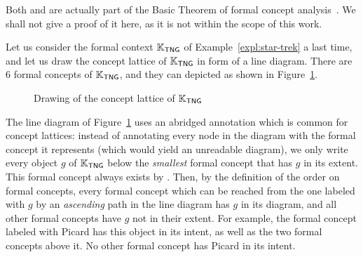 Both  and
 are actually part of the Basic Theorem
of formal concept analysis~\cite[Theorem ??]{fca-book}.  We shall not
give a proof of it here, as it is not within the scope of this work.

\begin{Example}
  \label{expl:star-trek-concept-lattice}
  Let us consider the formal context ${\mathbb{K}}_{\mathsf{TNG}}$ of
  Example~\ref{expl:star-trek} a last time, and let us draw the concept lattice of ${\mathbb{K}}_{\mathsf{TNG}}$ in form of a line diagram.  There are 6 formal concepts of ${\mathbb{K}}_{\mathsf{TNG}}$, and they can depicted as shown in
  Figure~\ref{fig:star-trek-concept-lattice}.

  \begin{figure}[tp]
    \centering
    \caption{Drawing of the concept lattice of ${\mathbb{K}}_{\mathsf{TNG}}$}
    \label{fig:star-trek-concept-lattice}
  \end{figure}

  The line diagram of Figure~\ref{fig:star-trek-concept-lattice} uses an abridged
  annotation which is common for concept lattices: instead of annotating every node in the
  diagram with the formal concept it represents (which would yield an unreadable diagram),
  we only write every object $g$ of ${\mathbb{K}}_{\mathsf{TNG}}$ below the \emph{smallest}
  formal concept that has $g$ in its extent.  This formal concept always exists by
  .  Then, by the definition of the
  order on formal concepts, every formal concept which can be reached from the one labeled
  with $g$ by an \emph{ascending} path in the line diagram has $g$ in its diagram, and all
  other formal concepts have $g$ not in their extent.  For example, the formal concept
  labeled with \textsf{Picard} has this object in its intent, as well as the two formal
  concepts above it.  No other formal concept has \textsf{Picard} in its intent.


\end{Example}
